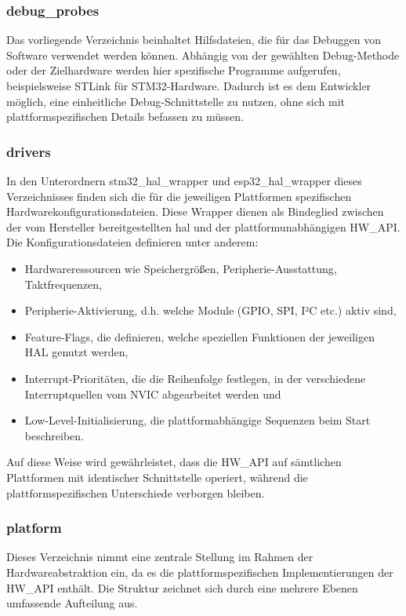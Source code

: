 \subsubsection*{debug\_probes}
Das vorliegende Verzeichnis beinhaltet Hilfsdateien, die für das Debuggen von Software verwendet werden können.
Abhängig von der gewählten Debug-Methode oder der Zielhardware werden hier spezifische Programme aufgerufen, beispielsweise STLink für STM32-Hardware.
Dadurch ist es dem Entwickler möglich, eine einheitliche Debug-Schnittstelle zu nutzen, ohne sich mit plattformspezifischen Details befassen zu müssen.

\subsubsection*{drivers}
In den Unterordnern stm32\_hal\_wrapper und esp32\_hal\_wrapper dieses Verzeichnisses finden sich die für die jeweiligen Plattformen spezifischen Hardwarekonfigurationsdateien.
Diese Wrapper dienen als Bindeglied zwischen der vom Hersteller bereitgestellten \gls{hal} und der plattformunabhängigen HW\_API.
Die Konfigurationsdateien definieren unter anderem:
\begin{itemize}
	\item Hardwareressourcen wie Speichergrößen, Peripherie-Ausstattung, Taktfrequenzen,
	\item Peripherie-Aktivierung, d.h. welche Module (GPIO, SPI, I²C etc.) aktiv sind,
	\item Feature-Flags, die definieren, welche speziellen Funktionen der jeweiligen HAL genutzt werden,
	\item Interrupt-Prioritäten, die die Reihenfolge festlegen, in der verschiedene Interruptquellen vom NVIC abgearbeitet werden und
	\item Low-Level-Initialisierung, die plattformabhängige Sequenzen beim Start beschreiben.
\end{itemize}

Auf diese Weise wird gewährleistet, dass die HW\_API auf sämtlichen Plattformen mit identischer Schnittstelle operiert, während die plattformspezifischen Unterschiede verborgen bleiben.

\subsubsection*{platform}
Dieses Verzeichnis nimmt eine zentrale Stellung im Rahmen der Hardwareabstraktion ein, da es die plattformspezifischen Implementierungen der HW\_API enthält.
Die Struktur zeichnet sich durch eine mehrere Ebenen umfassende Aufteilung aus.

